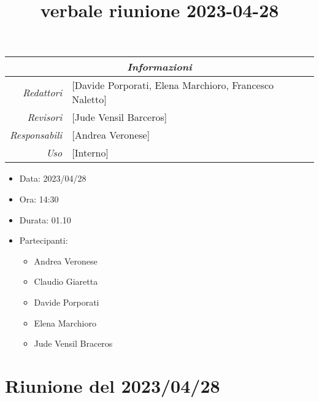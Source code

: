 \documentclass[12pt]{article}
\begin{document}
\graphicspath{ {../../templates/img} }

\title{verbale riunione 2023-04-28}

\firstPage
\maketitle

\begin{center}
\begin{tabular}{r | l}
    \multicolumn{2}{c}{\textit{Informazioni}}\\
    \hline
    
        \textit{Redattori} &
        [Davide Porporati, Elena Marchioro, Francesco Naletto]\makecell{}\\
    
        \textit{Revisori} &
        [Jude Vensil Barceros]\makecell{}\\
        \textit{Responsabili} &
        [Andrea Veronese]\makecell{}\\
            \textit{Uso} & 
            [Interno]\makecell{}\\
\end{tabular}
    \begin{itemize}
    \item[] Data: 2023/04/28
    \item[] Ora: 14:30
    \item[] Durata: 01.10
    \item[] Partecipanti:
    \begin{itemize}
    \item[] Andrea Veronese
    \item[] Claudio Giaretta
    \item[] Davide Porporati
    \item[] Elena Marchioro
    \item[] Jude Vensil Braceros
    \end{itemize}
    \end{itemize}
\end{center}


\tableofcontents
\printindex 
\section{Riunione del 2023/04/28}
\end{document}

